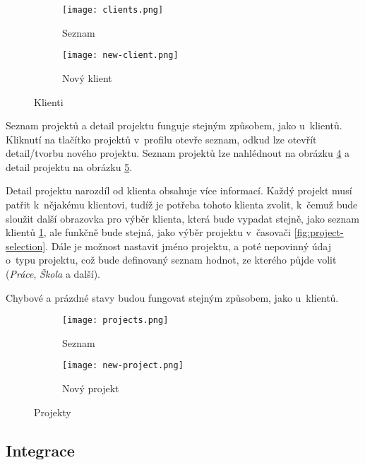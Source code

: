 \begin{figure}[h]
    \centering
    \begin{subfigure}[b]{0.4\textwidth}
		\centering
		\texttt{[image: clients.png]}
		\caption{Seznam}
		\label{fig:client-list}
	\end{subfigure}
	\hspace{2cm}
	\begin{subfigure}[b]{0.4\textwidth}
		\centering
		\texttt{[image: new-client.png]}
		\caption{Nový klient}
		\label{fig:new-client}
	\end{subfigure}
	\caption{Klienti}
	\label{fig:clients}
\end{figure}

Seznam projektů a detail projektu funguje stejným způsobem, jako u~klientů. Kliknutí na tlačítko projektů v~profilu otevře seznam, odkud lze otevřít detail/tvorbu nového projektu. Seznam projektů lze nahlédnout na obrázku \ref{fig:project-list} a detail projektu na obrázku \ref{fig:new-project}.

Detail projektu narozdíl od klienta obsahuje více informací. Každý projekt musí patřit k~nějakému klientovi, tudíž je potřeba tohoto klienta zvolit, k~čemuž bude sloužit další obrazovka pro výběr klienta, která bude vypadat stejně, jako seznam klientů \ref{fig:client-list}, ale funkčně bude stejná, jako výběr projektu v~časovači \ref{fig:project-selection}. Dále je možnost nastavit jméno projektu, a poté nepovinný údaj o~typu projektu, což bude definovaný seznam hodnot, ze kterého půjde volit (\emph{Práce}, \emph{Škola} a další).

Chybové a prázdné stavy budou fungovat stejným způsobem, jako u~klientů.

\begin{figure}[h]
    \centering
    \begin{subfigure}[b]{0.4\textwidth}
		\centering
		\texttt{[image: projects.png]}
		\caption{Seznam}
		\label{fig:project-list}
	\end{subfigure}
	\hspace{2cm}
	\begin{subfigure}[b]{0.4\textwidth}
		\centering
		\texttt{[image: new-project.png]}
		\caption{Nový projekt}
		\label{fig:new-project}
	\end{subfigure}
	\caption{Projekty}
	\label{fig:projects}
\end{figure}

\subsection{Integrace}\label{feature-integration}

